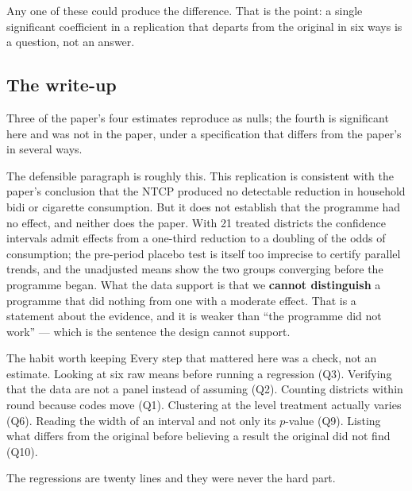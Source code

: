 \documentclass[11pt,a4paper]{article}
\newcommand{\qhead}[1]{\subsection*{#1}\addcontentsline{toc}{subsection}{#1}}
\begin{document}
Any one of these could produce the difference. That is the point: a single
significant coefficient in a replication that departs from the original in six
ways is a question, not an answer.

\qhead{The write-up}

Three of the paper's four estimates reproduce as nulls; the fourth is
significant here and was not in the paper, under a specification that differs
from the paper's in several ways.

The defensible paragraph is roughly this. This replication is consistent with
the paper's conclusion that the NTCP produced no detectable reduction in
household bidi or cigarette consumption. But it does not establish that the
programme had no effect, and neither does the paper. With 21 treated districts
the confidence intervals admit effects from a one-third reduction to a
doubling of the odds of consumption; the pre-period placebo test is itself too
imprecise to certify parallel trends, and the unadjusted means show the two
groups converging before the programme began. What the data support is that we
\textbf{cannot distinguish} a programme that did nothing from one with a
moderate effect. That is a statement about the evidence, and it is weaker than
``the programme did not work'' --- which is the sentence the design cannot
support.

\begin{notebox}{The habit worth keeping}
Every step that mattered here was a check, not an estimate. Looking at six raw
means before running a regression (Q3). Verifying that the data are not a panel
instead of assuming (Q2). Counting districts within round because codes move
(Q1). Clustering at the level treatment actually varies (Q6). Reading the width
of an interval and not only its $p$-value (Q9). Listing what differs from the
original before believing a result the original did not find (Q10).

The regressions are twenty lines and they were never the hard part.
\end{notebox}
\end{document}
